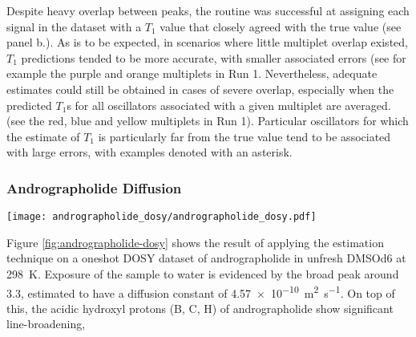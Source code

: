 Despite heavy overlap between peaks, the routine was successful at
assigning each signal in the dataset with a $T_1$ value that closely agreed
with the true value (see panel b.). As is to be expected, in scenarios where
little multiplet
overlap existed, $T_1$ predictions tended to be more accurate, with smaller
associated errors (see for example the purple and orange multiplets in Run 1.
Nevertheless, adequate estimates could still be obtained in cases of severe
overlap, especially when the predicted $T_1$s for all oscillators associated
with a given multiplet are averaged. (see the red, blue and yellow multiplets
in Run 1). Particular oscillators for which the estimate of $T_1$ is
particularly far from the true value tend to be associated with large errors,
with examples denoted with an asterisk.

\subsubsection{Andrographolide Diffusion}
\begin{sidewaysfigure}
    \centering
    \texttt{[image: andrographolide\_dosy/andrographolide\_dosy.pdf]}
    \caption[
        Result of estimating a Oneshot \acs{DOSY} dataset of andrographolide.
    ]{
        Result of estimating a Oneshot \ac{DOSY} dataset of andrographolide in
        unfresh \ac{DMSOd6}.
        \textbf{a.} \ac{1D} spectrum.
        \textbf{b.} Diffusion profile obtained by summing the contour plot in
        c. along the $x$-axis.
        \textbf{c.} Contour plot mapping estimated oscillators to diffusion constants, with
        $p_{\text{min}} = \qty{2e-10}{\meter\squared\per\second}$,
        $p_{\text{max}} = \qty{5e-10}{\meter\squared\per\second}$,
        $c = 2.5$,
        $R=128$.
        \textbf{d.} Magnified view of the \SIrange{2}{1.6}{\partspermillion}
        spectral range, with estimated oscillator peaks plotted.
    }
    \label{fig:andrographolide-dosy}
\end{sidewaysfigure}
Figure \ref{fig:andrographolide-dosy} shows the result of applying the
estimation technique on a oneshot \ac{DOSY} dataset of andrographolide in
unfresh \acs{DMSOd6} at \qty{298}{\kelvin}. Exposure of the sample to water is
evidenced by the broad
peak around \qty{3.3}{\partspermillion}, estimated to have a diffusion constant
of \qty{4.57e-10}{\meter\squared\per\second}. On top of this, the acidic
hydroxyl protons (B, C, H) of andrographolide show significant line-broadening,
